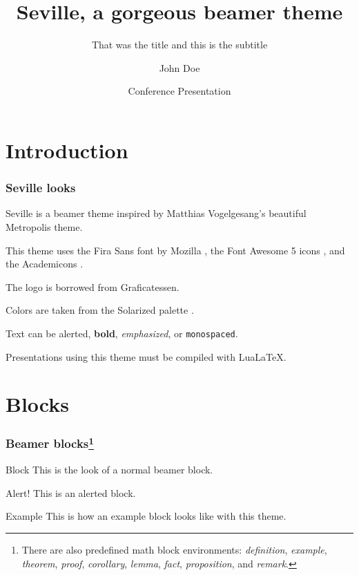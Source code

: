\documentclass{beamer}
\title{Seville, a gorgeous beamer theme}
\subtitle{That was the title and this is the subtitle}
\author{John Doe}
\date{Conference Presentation \the\year{}}
\institute{University of \LaTeX}
\begin{document}
\begin{frame}

    \titlepage

\end{frame}

\section{Introduction}

\begin{frame}
    \frametitle{Seville looks}

    Seville is a beamer theme inspired by Matthias Vogelgesang's beautiful Metropolis theme.

    This theme uses the Fira Sans font by Mozilla \faFirefox, the Font Awesome 5 icons \faFontAwesome, and the Academicons \aiAcademiaSquare.

    The logo is borrowed from Graficatessen.

    Colors are taken from the Solarized palette \faPalette.

    Text can be \alert{alerted}, \textbf{bold}, \emph{emphasized}, or \texttt{monospaced}.

    Presentations using this theme must be compiled with Lua\LaTeX.

\end{frame}

\section{Blocks}

\begin{frame}
    \frametitle{Beamer blocks\footnote{There are also predefined math block environments: \emph{definition}, \emph{example}, \emph{theorem}, \emph{proof}, \emph{corollary}, \emph{lemma}, \emph{fact}, \emph{proposition}, and \emph{remark}.}}

    \begin{block}{Block}
        This is the look of a normal beamer block.
    \end{block}

    \begin{alertblock}{Alert!}
        This is an alerted block.
    \end{alertblock}

    \begin{exampleblock}{Example}
        This is how an example block looks like with this theme.
    \end{exampleblock}

\end{frame}
\end{document}
